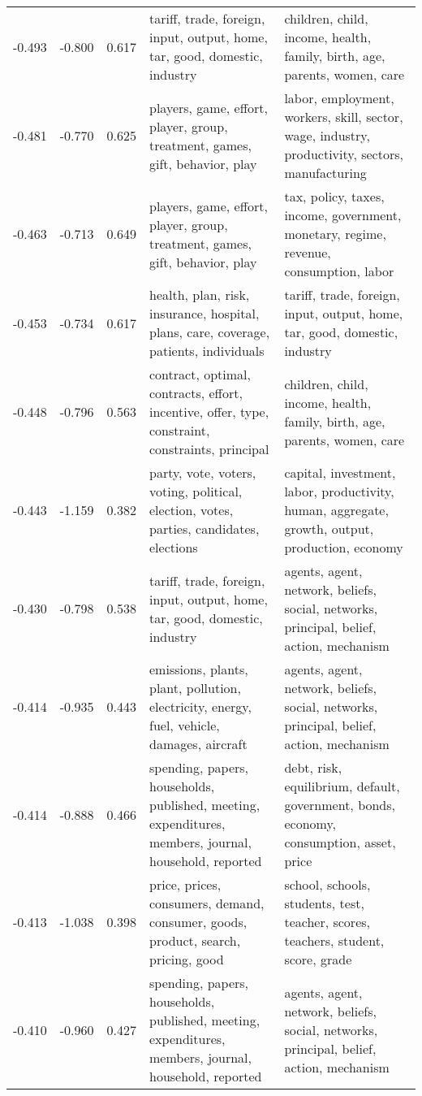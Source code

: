 \begin{tabular}{cccp{5cm}p{5cm}}
-0.493 & -0.800 & 0.617 & tariff, trade, foreign, input, output, home, tar, good, domestic, industry & children, child, income, health, family, birth, age, parents, women, care \\
-0.481 & -0.770 & 0.625 & players, game, effort, player, group, treatment, games, gift, behavior, play & labor, employment, workers, skill, sector, wage, industry, productivity, sectors, manufacturing \\
-0.463 & -0.713 & 0.649 & players, game, effort, player, group, treatment, games, gift, behavior, play & tax, policy, taxes, income, government, monetary, regime, revenue, consumption, labor \\
-0.453 & -0.734 & 0.617 & health, plan, risk, insurance, hospital, plans, care, coverage, patients, individuals & tariff, trade, foreign, input, output, home, tar, good, domestic, industry \\
-0.448 & -0.796 & 0.563 & contract, optimal, contracts, effort, incentive, offer, type, constraint, constraints, principal & children, child, income, health, family, birth, age, parents, women, care \\
-0.443 & -1.159 & 0.382 & party, vote, voters, voting, political, election, votes, parties, candidates, elections & capital, investment, labor, productivity, human, aggregate, growth, output, production, economy \\
-0.430 & -0.798 & 0.538 & tariff, trade, foreign, input, output, home, tar, good, domestic, industry & agents, agent, network, beliefs, social, networks, principal, belief, action, mechanism \\
-0.414 & -0.935 & 0.443 & emissions, plants, plant, pollution, electricity, energy, fuel, vehicle, damages, aircraft & agents, agent, network, beliefs, social, networks, principal, belief, action, mechanism \\
-0.414 & -0.888 & 0.466 & spending, papers, households, published, meeting, expenditures, members, journal, household, reported & debt, risk, equilibrium, default, government, bonds, economy, consumption, asset, price \\
-0.413 & -1.038 & 0.398 & price, prices, consumers, demand, consumer, goods, product, search, pricing, good & school, schools, students, test, teacher, scores, teachers, student, score, grade \\
-0.410 & -0.960 & 0.427 & spending, papers, households, published, meeting, expenditures, members, journal, household, reported & agents, agent, network, beliefs, social, networks, principal, belief, action, mechanism \\

\end{tabular}
